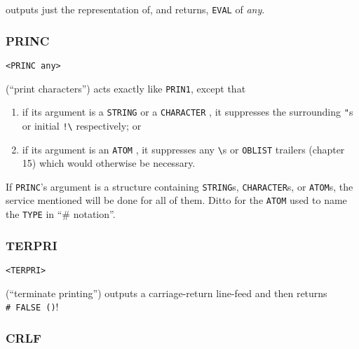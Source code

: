 \documentclass[a4paper]{scrbook}
\providecommand{\tightlist}{%
  \setlength{\itemsep}{0pt}\setlength{\parskip}{0pt}}
\begin{document}
 outputs just the representation of, and returns, \texttt{EVAL} of \emph{any}.

\subsubsection{PRINC}\label{princ}

\begin{verbatim}
<PRINC any>
\end{verbatim}

 (``print characters'') acts exactly like \texttt{PRIN1}, except that

\begin{enumerate}
\def\labelenumi{\arabic{enumi}.}
\tightlist
\item
  if its argument is a \texttt{STRING}  or a \texttt{CHARACTER} , it
  suppresses the surrounding \texttt{"}s  or initial \texttt{!\textbackslash{}}
   respectively; or
\item
  if its argument is an \texttt{ATOM} , it suppresses any
  \texttt{\textbackslash{}}s or \texttt{OBLIST}  trailers (chapter
  15) which would otherwise be necessary.
\end{enumerate}

If \texttt{PRINC}'s argument is a structure containing \texttt{STRING}s, \texttt{CHARACTER}s, or \texttt{ATOM}s, the
service mentioned will be done for all of them. Ditto for the \texttt{ATOM} used to name the \texttt{TYPE} in ``\#
notation''. \index{\texttt{\#}}

\subsubsection{TERPRI}\label{terpri}

\begin{verbatim}
<TERPRI>
\end{verbatim}

 (``terminate printing'') outputs a carriage-return line-feed and then returns
\texttt{\#\ FALSE\ ()}!

\subsubsection{CRLF}\label{crlf}
\end{document}
